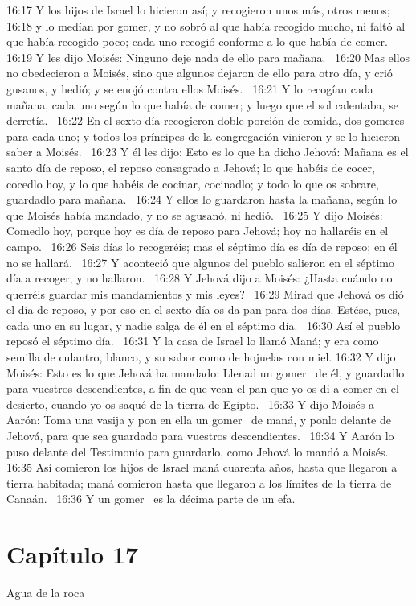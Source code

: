 16:17 Y los hijos de Israel lo hicieron así; y recogieron unos más, otros menos;  
16:18 y lo medían por gomer, y no sobró al que había recogido mucho, ni faltó al que había recogido poco; cada uno recogió conforme a lo que había de comer.  
16:19 Y les dijo Moisés: Ninguno deje nada de ello para mañana.  
16:20 Mas ellos no obedecieron a Moisés, sino que algunos dejaron de ello para otro día, y crió gusanos, y hedió; y se enojó contra ellos Moisés.  
16:21 Y lo recogían cada mañana, cada uno según lo que había de comer; y luego que el sol calentaba, se derretía.  
16:22 En el sexto día recogieron doble porción de comida, dos gomeres  para cada uno; y todos los príncipes de la congregación vinieron y se lo hicieron saber a Moisés.  
16:23 Y él les dijo: Esto es lo que ha dicho Jehová: Mañana es el santo día de reposo, el reposo consagrado a Jehová; lo que habéis de cocer, cocedlo hoy, y lo que habéis de cocinar, cocinadlo; y todo lo que os sobrare, guardadlo para mañana.  
16:24 Y ellos lo guardaron hasta la mañana, según lo que Moisés había mandado, y no se agusanó, ni hedió.  
16:25 Y dijo Moisés: Comedlo hoy, porque hoy es día de reposo para Jehová; hoy no hallaréis en el campo.  
16:26 Seis días lo recogeréis; mas el séptimo día es día de reposo; en él no se hallará.  
16:27 Y aconteció que algunos del pueblo salieron en el séptimo día a recoger, y no hallaron.  
16:28 Y Jehová dijo a Moisés: ¿Hasta cuándo no querréis guardar mis mandamientos y mis leyes?  
16:29 Mirad que Jehová os dió el día de reposo, y por eso en el sexto día os da pan para dos días. Estése, pues, cada uno en su lugar, y nadie salga de él en el séptimo día.  
16:30 Así el pueblo reposó el séptimo día.  
16:31 Y la casa de Israel lo llamó Maná; y era como semilla de culantro, blanco, y su sabor como de hojuelas con miel. 
16:32 Y dijo Moisés: Esto es lo que Jehová ha mandado: Llenad un gomer  de él, y guardadlo para vuestros descendientes, a fin de que vean el pan que yo os di a comer en el desierto, cuando yo os saqué de la tierra de Egipto.  
16:33 Y dijo Moisés a Aarón: Toma una vasija y pon en ella un gomer  de maná, y ponlo delante de Jehová, para que sea guardado para vuestros descendientes.  
16:34 Y Aarón lo puso delante del Testimonio para guardarlo, como Jehová lo mandó a Moisés.  
16:35 Así comieron los hijos de Israel maná cuarenta años, hasta que llegaron a tierra habitada; maná comieron hasta que llegaron a los límites de la tierra de Canaán.  
16:36 Y un gomer  es la décima parte de un efa.  
\section*{Capítulo 17}
Agua de la roca 

